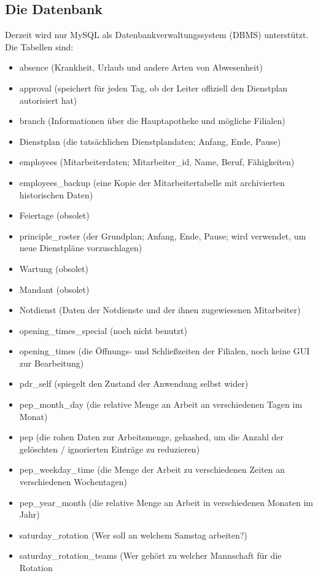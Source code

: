 \subsection{Die Datenbank}
Derzeit wird nur MySQL als Datenbankverwaltungssystem (DBMS)
unterstützt. Die Tabellen sind:
\begin{itemize}
\item absence (Krankheit, Urlaub und andere Arten von Abwesenheit)
\item approval (speichert für jeden Tag, ob der Leiter offiziell den Dienstplan
autorisiert hat)
\item branch (Informationen über die Hauptapotheke und mögliche Filialen)
\item Dienstplan (die tatsächlichen Dienstplandaten; Anfang, Ende, Pause)
\item employees (Mitarbeiterdaten; Mitarbeiter\_id, Name, Beruf, Fähigkeiten)
\item employees\_backup (eine Kopie der Mitarbeitertabelle mit archivierten
historischen Daten)
\item Feiertage (obsolet)
\item principle\_roster (der Grundplan; Anfang, Ende, Pause; wird verwendet, um
neue Dienstpläne vorzuschlagen)
\item Wartung (obsolet)
\item Mandant (obsolet)
\item Notdienst (Daten der Notdienste und der ihnen zugewiesenen Mitarbeiter)
\item opening\_times\_special (noch nicht benutzt)
\item opening\_times (die Öffnungs- und Schließzeiten der Filialen, noch keine GUI
zur Bearbeitung)
\item pdr\_self (spiegelt den Zustand der Anwendung selbst wider)
\item pep\_month\_day (die relative Menge an Arbeit an verschiedenen Tagen im
Monat)
\item pep (die rohen Daten zur Arbeitsmenge, gehashed, um die Anzahl der
gelöschten / ignorierten Einträge zu reduzieren)
\item pep\_weekday\_time (die Menge der Arbeit zu verschiedenen Zeiten an
verschiedenen Wochentagen)
\item pep\_year\_month (die relative Menge an Arbeit in verschiedenen Monaten im
Jahr)
\item saturday\_rotation (Wer soll an welchem Samstag arbeiten?)
\item saturday\_rotation\_teams (Wer gehört zu welcher Mannschaft für die Rotation

\end{itemize}
